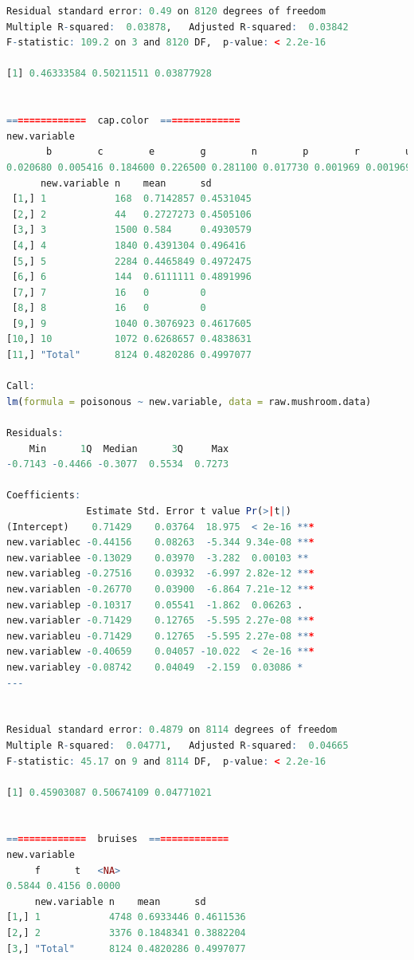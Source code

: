 \documentclass[12pt]{article}
\begin{document}
\begin{lstlisting}[language = R]
Residual standard error: 0.49 on 8120 degrees of freedom
Multiple R-squared:  0.03878,	Adjusted R-squared:  0.03842 
F-statistic: 109.2 on 3 and 8120 DF,  p-value: < 2.2e-16

[1] 0.46333584 0.50211511 0.03877928


==============  cap.color  ==============
new.variable
       b        c        e        g        n        p        r        u        w        y     <NA> 
0.020680 0.005416 0.184600 0.226500 0.281100 0.017730 0.001969 0.001969 0.128000 0.132000 0.000000 
      new.variable n    mean      sd       
 [1,] 1            168  0.7142857 0.4531045
 [2,] 2            44   0.2727273 0.4505106
 [3,] 3            1500 0.584     0.4930579
 [4,] 4            1840 0.4391304 0.496416 
 [5,] 5            2284 0.4465849 0.4972475
 [6,] 6            144  0.6111111 0.4891996
 [7,] 7            16   0         0        
 [8,] 8            16   0         0        
 [9,] 9            1040 0.3076923 0.4617605
[10,] 10           1072 0.6268657 0.4838631
[11,] "Total"      8124 0.4820286 0.4997077

Call:
lm(formula = poisonous ~ new.variable, data = raw.mushroom.data)

Residuals:
    Min      1Q  Median      3Q     Max 
-0.7143 -0.4466 -0.3077  0.5534  0.7273 

Coefficients:
              Estimate Std. Error t value Pr(>|t|)    
(Intercept)    0.71429    0.03764  18.975  < 2e-16 ***
new.variablec -0.44156    0.08263  -5.344 9.34e-08 ***
new.variablee -0.13029    0.03970  -3.282  0.00103 ** 
new.variableg -0.27516    0.03932  -6.997 2.82e-12 ***
new.variablen -0.26770    0.03900  -6.864 7.21e-12 ***
new.variablep -0.10317    0.05541  -1.862  0.06263 .  
new.variabler -0.71429    0.12765  -5.595 2.27e-08 ***
new.variableu -0.71429    0.12765  -5.595 2.27e-08 ***
new.variablew -0.40659    0.04057 -10.022  < 2e-16 ***
new.variabley -0.08742    0.04049  -2.159  0.03086 *  
---


Residual standard error: 0.4879 on 8114 degrees of freedom
Multiple R-squared:  0.04771,	Adjusted R-squared:  0.04665 
F-statistic: 45.17 on 9 and 8114 DF,  p-value: < 2.2e-16

[1] 0.45903087 0.50674109 0.04771021


==============  bruises  ==============
new.variable
     f      t   <NA> 
0.5844 0.4156 0.0000 
     new.variable n    mean      sd       
[1,] 1            4748 0.6933446 0.4611536
[2,] 2            3376 0.1848341 0.3882204
[3,] "Total"      8124 0.4820286 0.4997077


\end{lstlisting}
\end{document}
